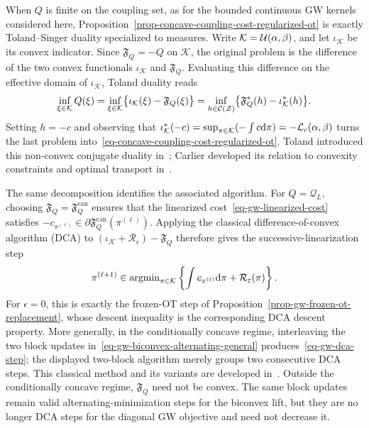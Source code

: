 \begin{rem}\label{rem-gw-toland-dca}
	When $Q$ is finite on the coupling set, as for the bounded continuous GW kernels considered here, Proposition~\ref{prop-concave-coupling-cost-regularized-ot} is exactly Toland--Singer duality specialized to measures. Write $\mathcal K=\mathcal{U}(\alpha,\beta)$, and let $\iota_{\mathcal K}$ be its convex indicator. Since $\mathfrak F_Q=-Q$ on $\mathcal K$, the original problem is the difference of the two convex functionals $\iota_{\mathcal K}$ and $\mathfrak F_Q$. Evaluating this difference on the effective domain of $\iota_{\mathcal K}$, Toland duality reads
	\begin{equation}\label{eq-gw-toland-duality}
		\inf_{\xi\in\mathcal K}Q(\xi)
		=
		\inf_{\xi\in\mathcal K}
		\bigl\{\iota_{\mathcal K}(\xi)-\mathfrak F_Q(\xi)\bigr\}
		=
		\inf_{h\in\mathcal{C}(\mathcal Z)}
		\bigl\{\mathfrak F_Q^*(h)-\iota_{\mathcal K}^*(h)\bigr\}.
	\end{equation}
	Setting $h=-c$ and observing that
	$\iota_{\mathcal K}^*(-c)
	=\sup_{\pi\in\mathcal K}(-\int c\mathrm{d}\pi)
	=-\mathcal{L}_c(\alpha,\beta)$
	turns the last problem into~\eqref{eq-concave-coupling-cost-regularized-ot}. Toland introduced this non-convex conjugate duality in~\cite{Toland1978NonconvexDuality}; Carlier developed its relation to convexity constraints and optimal transport in~\cite{Carlier2008TolandOT}.

	The same decomposition identifies the associated algorithm. For $Q=\mathcal Q_L$, choosing $\mathfrak F_Q=\mathfrak F_Q^{\mathrm{can}}$ ensures that the linearized cost~\eqref{eq-gw-linearized-cost} satisfies
	$-c_{\pi^{(\ell)}}\in\partial\mathfrak F_Q^{\mathrm{can}}(\pi^{(\ell)})$.
	Applying the classical difference-of-convex algorithm (DCA) to
	$(\iota_{\mathcal K}+\mathcal R_\epsilon)-\mathfrak F_Q$
	therefore gives the successive-linearization step
	\begin{equation}\label{eq-gw-dca-step}
		\pi^{(\ell+1)}
		\in
		\operatorname{argmin}_{\pi\in\mathcal K}
		\left\{
			\int c_{\pi^{(\ell)}}\mathrm{d}\pi+\mathcal R_\varepsilon(\pi)
		\right\}.
	\end{equation}
	For $\epsilon=0$, this is exactly the frozen-OT step of Proposition~\ref{prop-gw-frozen-ot-replacement}, whose descent inequality is the corresponding DCA descent property. More generally, in the conditionally concave regime, interleaving the two block updates in~\eqref{eq-gw-biconvex-alternating-general} produces~\eqref{eq-gw-dca-step}; the displayed two-block algorithm merely groups two consecutive DCA steps. This classical method and its variants are developed in~\cite{PhamDinhLeThi1997DCProgramming,LeThiPhamDinh2005DCA}. Outside the conditionally concave regime, $\mathfrak F_Q$ need not be convex. The same block updates remain valid alternating-minimization steps for the biconvex lift, but they are no longer DCA steps for the diagonal GW objective and need not decrease it.
\end{rem}


